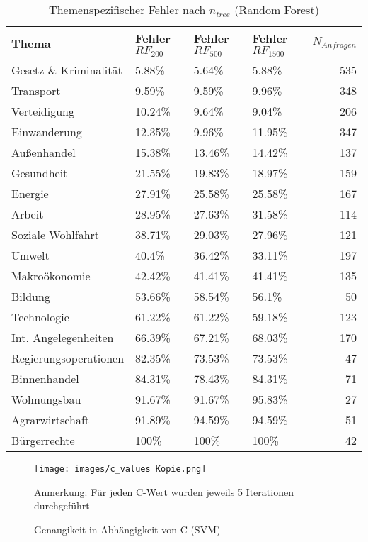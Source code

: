 \begin{table}[ht]
\centering
\caption{Themenspezifischer Fehler nach $n_{tree}$ (Random Forest)}
\begin{tabular}{llllr}
  \hline
  Thema & Fehler $RF_{200}$ & Fehler $RF_{500}$ & Fehler $RF_{1500}$ & $N_{Anfragen}$ \\ 
  \hline
  Gesetz \& Kriminalität & 5.88\% & 5.64\% & 5.88\% & 535 \\ 
   Transport & 9.59\% & 9.59\% & 9.96\% & 348 \\ 
   Verteidigung & 10.24\% & 9.64\% & 9.04\% & 206 \\ 
   Einwanderung & 12.35\% & 9.96\% & 11.95\% & 347 \\ 
   Außenhandel & 15.38\% & 13.46\% & 14.42\% & 137 \\ 
   Gesundheit & 21.55\% & 19.83\% & 18.97\% & 159 \\ 
   Energie & 27.91\% & 25.58\% & 25.58\% & 167 \\ 
   Arbeit & 28.95\% & 27.63\% & 31.58\% & 114 \\ 
   Soziale Wohlfahrt & 38.71\% & 29.03\% & 27.96\% & 121 \\ 
   Umwelt & 40.4\% & 36.42\% & 33.11\% & 197 \\ 
   Makroökonomie & 42.42\% & 41.41\% & 41.41\% & 135 \\ 
   Bildung & 53.66\% & 58.54\% & 56.1\% &  50 \\ 
   Technologie & 61.22\% & 61.22\% & 59.18\% & 123 \\ 
   Int. Angelegenheiten & 66.39\% & 67.21\% & 68.03\% & 170 \\ 
   Regierungsoperationen & 82.35\% & 73.53\% & 73.53\% &  47 \\ 
   Binnenhandel & 84.31\% & 78.43\% & 84.31\% &  71 \\ 
   Wohnungsbau & 91.67\% & 91.67\% & 95.83\% &  27 \\ 
   Agrarwirtschaft & 91.89\% & 94.59\% & 94.59\% &  51 \\ 
   Bürgerrechte & 100\% & 100\% & 100\% &  42 \\ 
   \hline
\end{tabular}
\end{table}

\begin{figure}[!h]
	\caption{Genaugikeit in Abhängigkeit von C (SVM)}
	\label{c_values}
	\centering
	\texttt{[image: images/c\_values Kopie.png]}
	\flushright
	{\scriptsize Anmerkung: Für jeden C-Wert wurden jeweils 5 Iterationen durchgeführt \par}
\end{figure}



